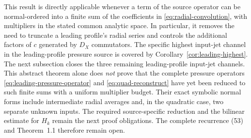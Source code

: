 This result is directly applicable whenever a term of the source operator can be normal-ordered into a finite sum of the coefficients in \eqref{eq:radial-convolution}, with multipliers in the stated common analytic space. In particular, it removes the need to truncate a leading profile's radial series and controls the additional factors of $c$ generated by $D_X$ commutators. The specific highest input-jet channel in the leading-profile pressure source is covered by Corollary~\ref{cor:leading-highest}. The next subsection closes the three remaining leading-profile input-jet channels. This abstract theorem alone does \emph{not} prove that the complete pressure operators \eqref{eq:leading-pressure-operator} and \eqref{eq:quad-reconstruct} have yet been reduced to such finite sums with a uniform multiplier budget. Their exact symbolic normal forms include intermediate radial averages and, in the quadratic case, two separate unknown inputs. The required source-specific reduction and the bilinear estimate for $H_k$ remain the next proof obligations. The complete recurrence (53) and Theorem~1.1 therefore remain open.
